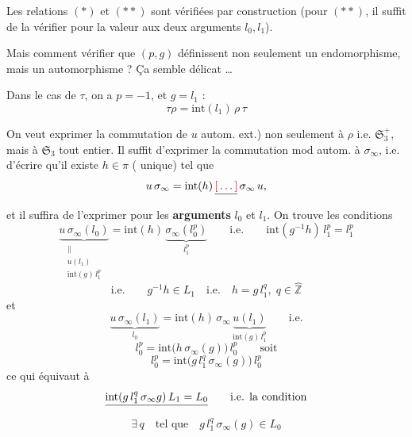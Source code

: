 \documentclass[11pt,a4paper]{article}
\begin{document}
Les relations $(*)$ et $(**)$ sont vérifiées par construction (pour $(**)$,
il suffit \struck{\ill{}} de la vérifier pour la valeur aux deux arguments
$l_0, l_1$).



Mais comment vérifier que $(p, g)$ définissent non seulement un endomorphisme,
mais un automorphisme ? Ça semble délicat …

Dans le cas de $\tau$, on a $p = -1$, et $g = l_1$ :
\[
\tau\rho = \mathrm{int}(l_1)\, \rho\, \tau
\]

On veut exprimer la commutation de $u$
\struck{\ill{}} autom. ext.) non seulement à $\rho$ i.e.
$\mathfrak{S}_3^{+}$, mais à $\mathfrak{S}_3$ tout entier. Il suffit
d'exprimer la commutation mod autom.  à $\sigma_\infty$,
i.e. d'écrire qu'il existe $h \in \pi$ ( unique) tel que
\[
u\,\sigma_\infty = \mathrm{int}(h)\, \struck{\ill{}}\, \sigma_\infty\, u ,
\]
et il suffira de l'exprimer pour les \textbf{arguments} $l_0$ et $l_1$. On
trouve les conditions
\[
\underbrace{u\,\sigma_\infty(l_0)}_{\substack{\| \\ u(l_1) \\ \mathrm{int}(g)\, l_1^{p}}}
= \mathrm{int}(h)\, \underbrace{\sigma_\infty(l_0^{p})}_{l_1^{p}}
\qquad \text{i.e.} \qquad \mathrm{int}(g^{-1}h)\, l_1^{p} = l_1^{p}
\]
\[
\text{i.e.} \qquad g^{-1}h \in L_1 \quad \text{i.e.} \quad h = g\, l_1^{q},\; q \in \hat{\mathbb{Z}}
\]
et
\[
\underbrace{u\,\sigma_\infty(l_1)}_{l_0} = \mathrm{int}(h)\, \sigma_\infty\, \underbrace{u(l_1)}_{\mathrm{int}(g)\, l_1^{p}}
\qquad \text{i.e.}
\]
\[
l_0^{p} = \mathrm{int}\bigl(h\, \sigma_\infty(g)\bigr)\, l_0^{p} \qquad \text{soit}
\]
\[
l_0^{p} = \mathrm{int}\bigl(g\, l_1^{q}\, \sigma_\infty(g)\bigr)\, l_0^{p}
\]
ce qui équivaut à
\[
\struck{\mathrm{int}(g\, l_1^{q}\, \sigma_\infty g)\, L_1 = L_0}
\qquad \text{i.e. la condition}
\]
\[
\exists\, q \quad \text{tel que} \quad g\, l_1^{q}\, \sigma_\infty(g) \in L_0
\]


\end{document}
